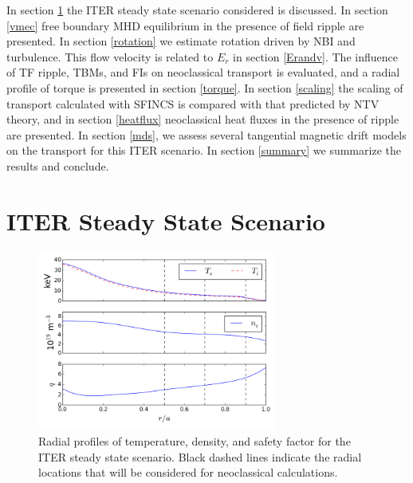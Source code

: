\documentclass[aip, pop, preprint]{revtex4-1}
\numberwithin{figure}{section}
\numberwithin{equation}{section}
\begin{document}
In section \ref{steadystate} the ITER steady state scenario considered is discussed. In section \ref{vmec} free boundary MHD equilibrium in the presence of field ripple are presented. In section \ref{rotation} we estimate rotation driven by NBI and turbulence. This flow velocity is related to $E_r$ in section \ref{Erandv}. The influence of TF ripple, TBMs, and FIs on neoclassical transport is evaluated, and a radial profile of torque is presented in section \ref{torque}. In section \ref{scaling} the scaling of transport calculated with SFINCS is compared with that predicted by NTV theory, and in section \ref{heatflux} neoclassical heat fluxes in the presence of ripple are presented. In section \ref{mds}, we assess several tangential magnetic drift models on the transport for this ITER scenario. In section \ref{summary} we summarize the results and conclude.

\section{ITER Steady State Scenario}\label{steadystate}

\FloatBarrier

\begin{figure}[h!]
\centering
\includegraphics[width=0.7\textwidth]{profiles.png}
\caption{\label{fig:profiles} Radial profiles of temperature, density, and safety factor for the ITER steady state scenario.\cite{Poli2014} Black dashed lines indicate the radial locations that will be considered for neoclassical calculations.}
\end{figure}
\end{document}
